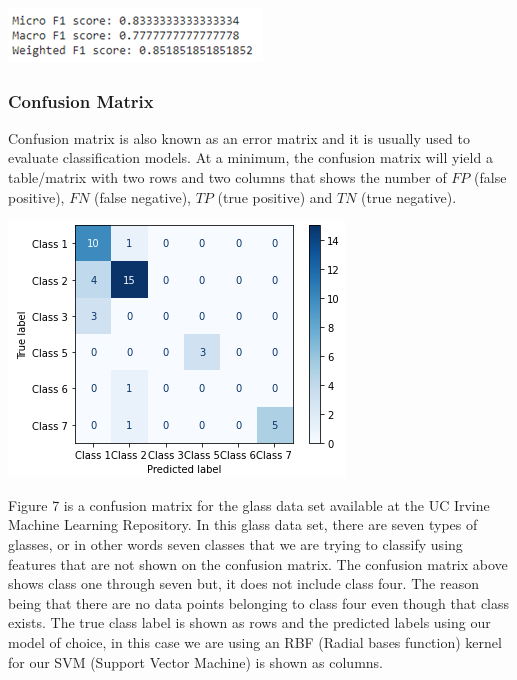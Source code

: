 \documentclass[a4paper,12pt]{report}
\begin{document}
\begin{center}
    \captionsetup{type=figure}
    \includegraphics[width=.9\linewidth]{media/F1Results.png}
\end{center}

\subsubsection{Confusion Matrix}

Confusion matrix is also known as an error matrix and it is usually used to evaluate classification models. At a minimum, the confusion matrix will yield a table/matrix with two rows and two columns that shows the number of $FP$ (false positive), $FN$ (false negative), $TP$ (true positive) and $TN$ (true negative).

\begin{center}
    \captionsetup{type=figure}
    \includegraphics[width=.9\linewidth]{media/ConfusionMatrix.png}
\end{center}
 
Figure 7 is a confusion matrix for the glass data set available at the UC Irvine Machine Learning Repository. In this glass data set, there are seven types of glasses, or in other words seven classes that we are trying to classify using features that are not shown on the confusion matrix. The confusion matrix above shows class one through seven but, it does not include class four. The reason being that there are no data points belonging to class four even though that class exists. The true class label is shown as rows and the predicted labels using our model of choice, in this case we are using an RBF (Radial bases function) kernel for our SVM (Support Vector Machine) is shown as columns.
\end{document}
